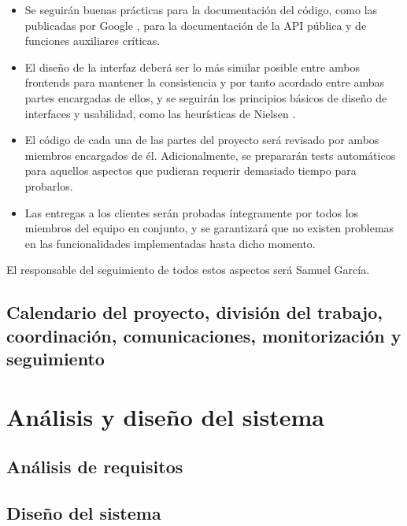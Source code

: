 \documentclass[12pt, a4paper, titlepage]{article}
\begin{document}
\begin{itemize}
    \item Se seguirán buenas prácticas para la documentación del código, como las publicadas por Google \cite{documentaciongoogle}, para la documentación de la API pública y de funciones auxiliares críticas.
    
    \item El diseño de la interfaz deberá ser lo más similar posible entre ambos frontends para mantener la consistencia y por tanto acordado entre ambas partes encargadas de ellos, y se seguirán los principios básicos de diseño de interfaces y usabilidad, como las heurísticas de Nielsen \cite{heuristicasnielsen}.
    
    \item El código de cada una de las partes del proyecto será revisado por ambos miembros encargados de él. Adicionalmente, se prepararán tests automáticos para aquellos aspectos que pudieran requerir demasiado tiempo para probarlos.
    
    \item Las entregas a los clientes serán probadas íntegramente por todos los miembros del equipo en conjunto, y se garantizará que no existen problemas en las funcionalidades implementadas hasta dicho momento.
\end{itemize}

El responsable del seguimiento de todos estos aspectos será Samuel García.



\subsection{Calendario del proyecto, división del trabajo, coordinación, comunicaciones, monitorización y seguimiento}

\section{Análisis y diseño del sistema}

\subsection{Análisis de requisitos}

\subsection{Diseño del sistema}
\end{document}
